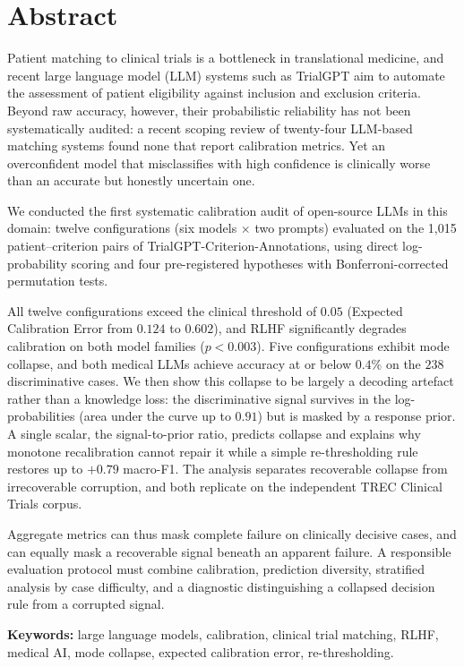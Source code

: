 
\chapter*{Abstract}

Patient matching to clinical trials is a bottleneck in translational 
medicine, and recent large language model (LLM) systems such as TrialGPT 
aim to automate the assessment of patient eligibility against inclusion 
and exclusion criteria. Beyond raw accuracy, however, their probabilistic 
reliability has not been systematically audited: a recent scoping review 
of twenty-four LLM-based matching systems found none that report 
calibration metrics. Yet an overconfident model that misclassifies with 
high confidence is clinically worse than an accurate but honestly 
uncertain one.

We conducted the first systematic calibration audit of open-source LLMs 
in this domain: twelve configurations (six models $\times$ two prompts) 
evaluated on the 1{,}015 patient--criterion pairs of 
TrialGPT-Criterion-Annotations, using direct log-probability scoring and 
four pre-registered hypotheses with Bonferroni-corrected permutation 
tests.

All twelve configurations exceed the clinical threshold of $0.05$ 
(Expected Calibration Error from $0.124$ to $0.602$), and RLHF 
significantly degrades calibration on both model families ($p < 0.003$). 
Five configurations exhibit mode collapse, and both medical LLMs achieve 
accuracy at or below $0.4\%$ on the $238$ discriminative cases. We then 
show this collapse to be largely a decoding artefact rather than a 
knowledge loss: the discriminative signal survives in the 
log-probabilities (area under the curve up to $0.91$) but is masked by a 
response prior. A single scalar, the signal-to-prior ratio, predicts 
collapse and explains why monotone recalibration cannot repair it while a 
simple re-thresholding rule restores up to $+0.79$ macro-F1. The analysis 
separates recoverable collapse from irrecoverable corruption, and both 
replicate on the independent TREC Clinical Trials corpus.

Aggregate metrics can thus mask complete failure on clinically decisive 
cases, and can equally mask a recoverable signal beneath an apparent 
failure. A responsible evaluation protocol must combine calibration, 
prediction diversity, stratified analysis by case difficulty, and a 
diagnostic distinguishing a collapsed decision rule from a corrupted 
signal.

\vspace{0.5cm}
\noindent\textbf{Keywords:} large language models, calibration, 
clinical trial matching, RLHF, medical AI, mode collapse, expected 
calibration error, re-thresholding.

\cleardoublepage